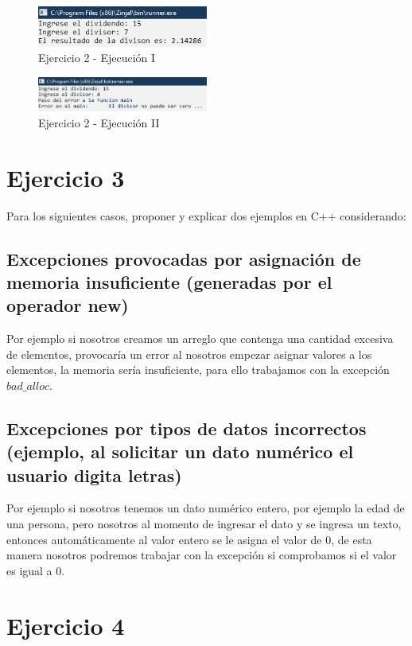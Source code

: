 \documentclass[12pt]{article}
\begin{document}
\begin{figure}[h]
    \centering
    \includegraphics[width=0.5\textwidth]{images/Capture02A.PNG}
    \caption{Ejercicio 2 - Ejecución I}
\end{figure}

\begin{figure}[h]
    \centering
    \includegraphics[width=0.5\textwidth]{images/Capture02B.PNG}
    \caption{Ejercicio 2 - Ejecución II}
\end{figure}

\section{Ejercicio 3}

Para los siguientes casos, proponer y explicar dos ejemplos en C++
considerando:

\subsection{Excepciones provocadas por asignación de memoria insuficiente
(generadas por el operador new)}

Por ejemplo si nosotros creamos un arreglo que contenga una cantidad excesiva de elementos, provocaría un error al nosotros empezar asignar valores a los elementos, la memoria sería insuficiente, para ello trabajamos con la excepción $bad\_alloc$.

\subsection{Excepciones por tipos de datos incorrectos (ejemplo, al solicitar un dato
numérico el usuario digita letras)}

Por ejemplo si nosotros tenemos un dato numérico entero, por ejemplo la edad de una persona, pero nosotros al momento de ingresar el dato y se ingresa un texto, entonces automáticamente al valor entero se le asigna el valor de 0, de esta manera nosotros podremos trabajar con la excepción si comprobamos si el valor es igual a 0.

\section{Ejercicio 4}
\end{document}
